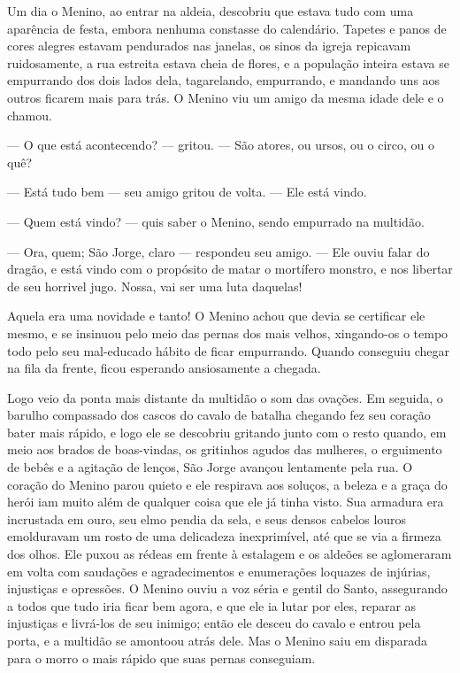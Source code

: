 Um dia o Menino, ao entrar na aldeia, descobriu que estava tudo com
uma aparência de festa, embora nenhuma constasse do calendário.
Tapetes e panos de cores alegres estavam pendurados nas janelas, os
sinos da igreja repicavam ruidosamente, a rua estreita estava cheia
de flores, e a população inteira estava se empurrando dos dois lados
dela, tagarelando, empurrando, e mandando uns aos outros ficarem mais
para trás. O Menino viu um amigo da mesma idade dele e o chamou. 

— O que está acontecendo? — gritou. — São atores, ou ursos, ou o
circo, ou o quê?

— Está tudo bem — seu amigo gritou de volta. — Ele está vindo.

— Quem está vindo? — quis saber o Menino, sendo empurrado na multidão.

— Ora, quem; São Jorge, claro — respondeu seu amigo. — Ele ouviu falar
do dragão, e está vindo com o propósito de matar o mortífero monstro,
e nos libertar de seu horrivel jugo. Nossa, vai ser uma luta
daquelas!

Aquela era uma novidade e tanto! O Menino achou que devia se
certificar ele mesmo, e se insinuou pelo meio das pernas dos mais
velhos, xingando-os o tempo todo pelo seu mal-educado hábito de ficar
empurrando. Quando conseguiu chegar na fila da frente, ficou
esperando ansiosamente a chegada.

Logo veio da ponta mais distante da multidão o som das ovações. Em
seguida, o barulho compassado dos cascos do cavalo de batalha
chegando fez seu coração bater mais rápido, e logo ele se descobriu
gritando junto com o resto quando, em meio aos brados de boas-vindas,
os gritinhos agudos das mulheres, o erguimento de bebês e a agitação
de lenços, São Jorge avançou lentamente pela rua. O coração do Menino
parou quieto e ele respirava aos soluços, a beleza e a graça do herói
iam muito além de qualquer coisa que ele já tinha visto. Sua armadura
era incrustada em ouro, seu elmo pendia da sela, e seus densos
cabelos louros emolduravam um rosto de uma delicadeza inexprimível,
até que se via a firmeza dos olhos. Ele puxou as rédeas em frente à
estalagem e os aldeões se aglomeraram em volta com saudações e
agradecimentos e enumerações loquazes de injúrias, injustiças e
opressões. O Menino ouviu a voz séria e gentil do Santo, assegurando
a todos que tudo iria ficar bem agora, e que ele ia lutar por eles,
reparar as injustiças e livrá-los de seu inimigo; então ele desceu do
cavalo e entrou pela porta, e a multidão se amontoou atrás dele. Mas
o Menino saiu em disparada para o morro o mais rápido que suas pernas
conseguiam.

